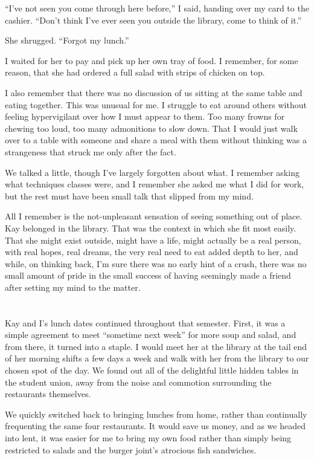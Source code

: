 ``I've not seen you come through here before,'' I said, handing over my card to the cashier. ``Don't think I've ever seen you outside the library, come to think of it.''

She shrugged. ``Forgot my lunch.''

I waited for her to pay and pick up her own tray of food. I remember, for some reason, that she had ordered a full salad with strips of chicken on top.

I also remember that there was no discussion of us sitting at the same table and eating together. This was unusual for me. I struggle to eat around others without feeling hypervigilant over how I must appear to them. Too many frowns for chewing too loud, too many admonitions to slow down. That I would just walk over to a table with someone and share a meal with them without thinking was a strangeness that struck me only after the fact.

We talked a little, though I've largely forgotten about what. I remember asking what techniques classes were, and I remember she asked me what I did for work, but the rest must have been small talk that slipped from my mind.

All I remember is the not-unpleasant sensation of seeing something out of place. Kay belonged in the library. That was the context in which she fit most easily. That she might exist outside, might have a life, might actually be a real person, with real hopes, real dreams, the very real need to eat added depth to her, and while, on thinking back, I'm sure there was no early hint of a crush, there was no small amount of pride in the small success of having seemingly made a friend after setting my mind to the matter.

\section{}

Kay and I's lunch dates continued throughout that semester. First, it was a simple agreement to meet ``sometime next week'' for more soup and salad, and from there, it turned into a staple. I would meet her at the library at the tail end of her morning shifts a few days a week and walk with her from the library to our chosen spot of the day. We found out all of the delightful little hidden tables in the student union, away from the noise and commotion surrounding the restaurants themselves.

We quickly switched back to bringing lunches from home, rather than continually frequenting the same four restaurants. It would save us money, and as we headed into lent, it was easier for me to bring my own food rather than simply being restricted to salads and the burger joint's atrocious fish sandwiches.


